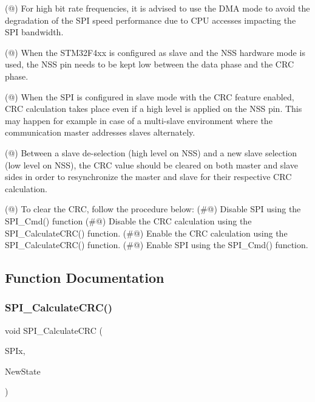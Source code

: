 \begin{DoxyVerb}
   (@) For high bit rate frequencies, it is advised to use the DMA mode to avoid the
       degradation of the SPI speed performance due to CPU accesses impacting the 
       SPI bandwidth.

   (@) When the STM32F4xx is configured as slave and the NSS hardware mode is 
       used, the NSS pin needs to be kept low between the data phase and the CRC 
       phase.

   (@) When the SPI is configured in slave mode with the CRC feature enabled, CRC
       calculation takes place even if a high level is applied on the NSS pin. 
       This may happen for example in case of a multi-slave environment where the 
       communication master addresses slaves alternately.

   (@) Between a slave de-selection (high level on NSS) and a new slave selection 
       (low level on NSS), the CRC value should be cleared on both master and slave
       sides in order to resynchronize the master and slave for their respective 
       CRC calculation.

   (@) To clear the CRC, follow the procedure below:
       (#@) Disable SPI using the SPI_Cmd() function
       (#@) Disable the CRC calculation using the SPI_CalculateCRC() function.
       (#@) Enable the CRC calculation using the SPI_CalculateCRC() function.
       (#@) Enable SPI using the SPI_Cmd() function.\end{DoxyVerb}
 

\subsection{Function Documentation}
\mbox{\label{group___s_p_i___group3_ga64f7276d119e6cb58afc100f8832adb0}} 
\subsubsection{\texorpdfstring{S\+P\+I\+\_\+\+Calculate\+C\+R\+C()}{SPI\_CalculateCRC()}}
{\footnotesize\ttfamily void S\+P\+I\+\_\+\+Calculate\+C\+RC (\begin{DoxyParamCaption}\item[{S\+P\+I\+\_\+\+Type\+Def $\ast$}]{S\+P\+Ix,  }\item[{Functional\+State}]{New\+State }\end{DoxyParamCaption})}



